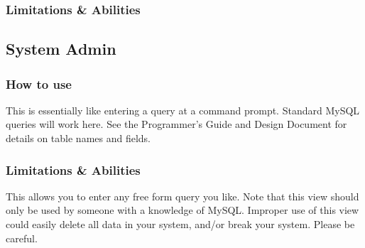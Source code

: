 \subsubsection{Limitations \& Abilities}



\subsection{System Admin}
\subsubsection{How to use}
This is essentially like entering a query at a command prompt. Standard MySQL queries will work here. See the Programmer's Guide and Design Document for details on table names and fields.

\subsubsection{Limitations \& Abilities}
This allows you to enter any free form query you like. Note that this view should only be used by someone with a knowledge of MySQL. Improper use of this view could easily delete all data in your system, and/or break your system. Please be careful.


